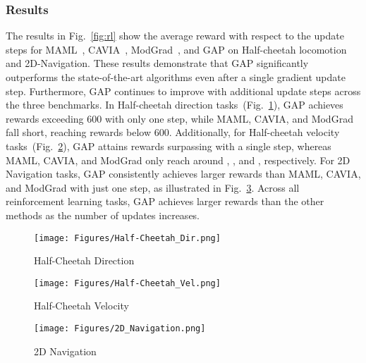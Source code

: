 \subsubsection{Results}
The results in Fig.~\ref{fig:rl} show the average reward with respect to the update steps for MAML~\cite{finn2017model}, CAVIA~\cite{zintgraf2019fast}, ModGrad~\cite{simon2020modulating}, and GAP on Half-cheetah locomotion and 2D-Navigation.
These results demonstrate that GAP significantly outperforms the state-of-the-art algorithms even after a single gradient update step. Furthermore, GAP continues to improve with additional update steps across the three benchmarks. 
In Half-cheetah direction tasks~(Fig.~\ref{fig:rl_a}), GAP achieves rewards exceeding 600 with only one step, while MAML, CAVIA, and ModGrad fall short, reaching rewards below 600. 
Additionally, for Half-cheetah velocity tasks~(Fig.~\ref{fig:rl_b}), GAP attains rewards surpassing  with a single step, whereas MAML, CAVIA, and ModGrad only reach around , , and , respectively. 
For 2D Navigation tasks, GAP consistently achieves larger rewards than MAML, CAVIA, and ModGrad with just one step, as illustrated in Fig.~\ref{fig:rl_c}. 
Across all reinforcement learning tasks, GAP achieves larger rewards than the other methods as the number of updates increases.

\begin{figure*}[!t]
\centering
\begin{subfigure}{0.3\textwidth}
    \texttt{[image: Figures/Half-Cheetah\_Dir.png]}
    \caption{Half-Cheetah Direction}
    \label{fig:rl_a}
\end{subfigure}
\begin{subfigure}{0.3\textwidth}
    \texttt{[image: Figures/Half-Cheetah\_Vel.png]}
    \caption{Half-Cheetah Velocity}
    \label{fig:rl_b}
\end{subfigure}
\begin{subfigure}{0.3\textwidth}
    \texttt{[image: Figures/2D\_Navigation.png]}
    \caption{2D Navigation}
    \label{fig:rl_c}
\end{subfigure}
\caption{The average reward performance of MAML family and GAP models for reinforcement learning on half-cheetah direction, half-cheetah velocity, and 2D navigation. We report the performance as the number of gradient updates increases.}
\label{fig:rl}
\end{figure*}